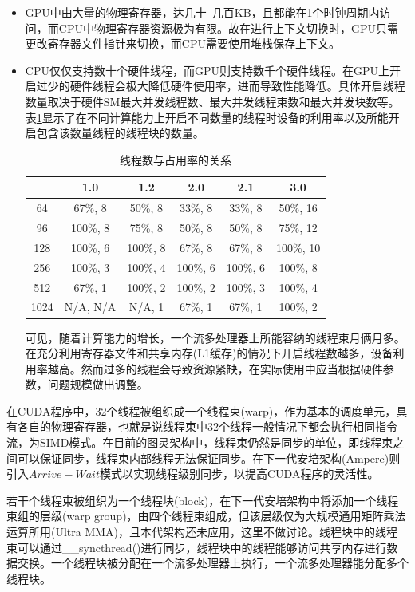 \begin{itemize}
	\item GPU中由大量的物理寄存器，达几十~几百KB，且都能在1个时钟周期内访问，而CPU中物理寄存器资源极为有限。故在进行上下文切换时，GPU只需更改寄存器文件指针来切换，而CPU需要使用堆栈保存上下文。
	\item CPU仅仅支持数十个硬件线程，而GPU则支持数千个硬件线程。在GPU上开启过少的硬件线程会极大降低硬件使用率，进而导致性能降低。具体开启线程数量取决于硬件SM最大并发线程数、最大并发线程束数和最大并发块数等。表\ref{table-占用率}显示了在不同计算能力上开启不同数量的线程时设备的利用率以及所能开启包含该数量线程的线程块的数量。\\
	\begin{table}
	\centering
	\caption{线程数与占用率的关系}
	\begin{tabular}{cccccc}
		\toprule
			&	1.0	&1.2	&2.0	&2.1	&3.0 \\
		\midrule
		64	&	67\%, 8		&	50\%, 8		&	33\%, 8		&	33\%, 8		&	50\%, 16	\\
		96	&	100\%, 8	&	75\%, 8		&	50\%, 8		&	50\%, 8		&	75\%, 12	\\
		128	&	100\%, 6	&	100\%, 8	&	67\%, 8		&	67\%, 8		&	100\%, 10	\\
		256	&	100\%, 3	&	100\%, 4	&	100\%, 6	&	100\%, 6	&	100\%, 8	\\
		512	&	67\%, 1		&	100\%, 2	&	100\%, 2	&	100\%, 3	&	100\%, 4	\\
		1024&	N/A, N/A	&	N/A, 1		&	67\%, 1		&	67\%, 1		&	100\%, 2	\\
		
		\bottomrule
	\end{tabular} \label{table-占用率}
	\end{table}
	可见，随着计算能力的增长，一个流多处理器上所能容纳的线程束月俩月多。在充分利用寄存器文件和共享内存(L1缓存)的情况下开启线程数越多，设备利用率越高。然而过多的线程会导致资源紧缺，在实际使用中应当根据硬件参数，问题规模做出调整。
\end{itemize}
\par 在CUDA程序中，32个线程被组织成一个线程束(warp)，作为基本的调度单元，具有各自的物理寄存器，也就是说线程束中32个线程一般情况下都会执行相同指令流，为SIMD模式。在目前的图灵架构中，线程束仍然是同步的单位，即线程束之间可以保证同步，线程束内部线程无法保证同步。在下一代安培架构(Ampere)则引入$ Arrive-Wait $模式以实现线程级别同步，以提高CUDA程序的灵活性。 
\par 若干个线程束被组织为一个线程块(block)，在下一代安培架构中将添加一个线程束组的层级(warp group)，由四个线程束组成，但该层级仅为大规模通用矩阵乘法运算所用(Ultra MMA)，且本代架构还未应用，这里不做讨论。线程块中的线程束可以通过\_\_syncthread()进行同步，线程块中的线程能够访问共享内存进行数据交换。一个线程块被分配在一个流多处理器上执行，一个流多处理器能分配多个线程块。
